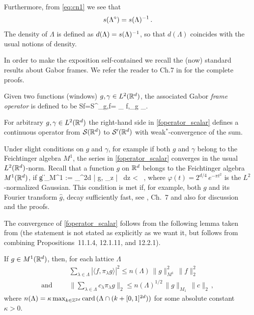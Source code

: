 \documentclass[12pt]{amsart}
\begin{document}
 Furthermore, from \eqref{eq:cn1} we see that  
\begin{equation}
  \label{eq:c7}
  s(\Lambda ^\circ ) = s(\Lambda ) ^{-1} \, .
\end{equation}
The density of $\Lambda $ is defined as $d(\Lambda ) = s(\Lambda )^{-1}
$, so that $d(\Lambda )$ coincides with the usual notions of density.
 

 


\smallskip


In order to make the exposition self-contained  we recall the (now)
standard results about Gabor frames.  We refer the reader to Ch.7 in
\cite{Charlybook} for the complete proofs. 

  Given two functions (windows)  
$ g, \gamma  \in L^2(\mathbb{R} ^d)$,  the associated Gabor {\em frame
operator} is defined to be 
\beq
\label{foperator_scalar}
Sf=S^\Lambda_{g,\gamma}f=
      \sum_{\lambda \in \Lambda} \lng f,\pi_\lambda g \rng \pi_\lambda \gamma .
\eeq

 

For arbitrary $ g, \gamma  \in L^2(\mathbb{R} ^d)$ the right-hand side in \eqref{foperator_scalar}
defines a continuous operator from $\mathcal{S} (\mathbb{R} ^d )$
to $\mathcal{S} ' (\mathbb{R} ^d )$ with weak$^*$-convergence of the sum.
 
 Under  slight conditions on $g$ and $\gamma$, 
 for example if both $g$ and $\gamma$  belong to the Feichtinger algebra 
 $M^1$,    the series in \eqref{foperator_scalar} converges in the usual 
 $L^2(\mathbb{R} ^d)$-norm.  Recall that a function $g$ on $\mathbb{R} ^d $  belongs to the Feichtinger algebra 
 $M^1(\mathbb{R} ^d)$, if 
 \beq
 \label{m_one}
\|g \|_{M^1} :=  \int _{\bR^{2d} } |
\langle g, \pi _z \varphi  \rangle | \, dz < \infty \, , 
\eeq
where $\varphi (t) = 2^{d/4}\, e^{-\pi t^2}$ is the $L^2$-normalized
Gaussian. 
This condition is met if, for example,  both $g$ and its Fourier transform 
$\hat{g}$, decay sufficiently fast, 
 see  \cite{Charlybook}, Ch.~7 and also \cite{ grstudia} for
 discussion and the proofs.  

The convergence of \eqref{foperator_scalar} follows from the following
lemma taken from \cite{Charlybook} (the statement is not stated as
explicitly as we want it, but follows from combining
Propositions~11.1.4, 12.1.11, and 12.2.1). 

\begin{lemma} \label{bessel}
  If $g\in M^1(\mathbb{R} ^d )$, then, for each lattice $\Lambda$ 
  \begin{eqnarray}
    \label{eq:cn2}
 &    &     \sum _{\lambda \in \Lambda } |\langle f, \pi _\lambda g\rangle |^2
    \leq n(\Lambda ) \, \|g\|_{M^1} ^2 \, \|f\|_2^2 \\
\mathrm{and} \,\,\,\,\, &   &  \|\sum _{\lambda \in \Lambda } c_\lambda  \pi _\lambda
g\|_2 \leq n(\Lambda ) ^{1/2} \, \|g\|_{M_1} \, \|c\|_2 \, ,  \label{eq:cn3}
  \end{eqnarray}
where $n(\Lambda )  = \kappa \max _{k\in \mathbb{Z} ^{2d}} \mathrm{card}\, (\Lambda \cap (k+[0,1]^{2d}))$ for some absolute constant $\kappa >0$. 
\end{lemma}
\end{document}
